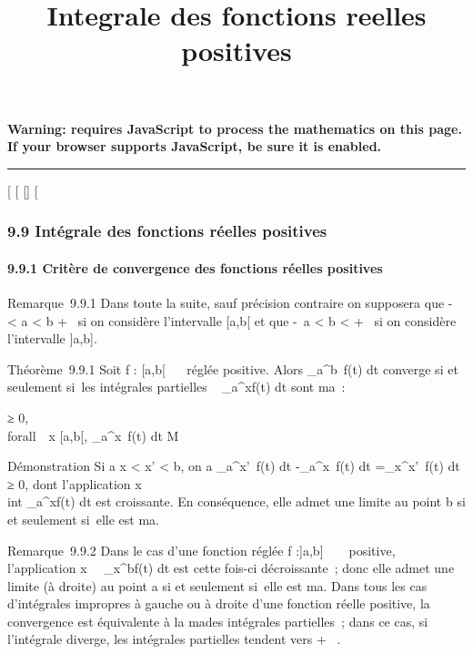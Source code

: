 \documentclass[]{article}
\title{Integrale des fonctions reelles positives}
\author{}
\date{}
\begin{document}
\maketitle

\textbf{Warning: 
requires JavaScript to process the mathematics on this page.\\ If your
browser supports JavaScript, be sure it is enabled.}

\begin{center}\rule{3in}{0.4pt}\end{center}

{[}
{[}
{[}{]}
{[}

\subsubsection{9.9 Intégrale des fonctions réelles positives}

\paragraph{9.9.1 Critère de convergence des fonctions réelles positives}

Remarque~9.9.1 Dans toute la suite, sauf précision contraire on
supposera que -\infty~ \textless{} a \textless{} b \leq +\infty~ si on considère
l'intervalle {[}a,b{[} et que -\infty~\leq a \textless{} b \textless{} +\infty~ si on
considère l'intervalle {]}a,b{]}.

Théorème~9.9.1 Soit f : {[}a,b{[}\rightarrow~ ~ réglée positive. Alors
\int  \_a^b~f(t) dt converge si et
seulement si~les intégrales partielles \int ~
\_a^xf(t) dt sont ma~:

\existsM ≥ 0, \\forall~~x \in
{[}a,b{[}, \int  \_a^x~f(t) dt \leq M

Démonstration Si a \leq x \textless{} x' \textless{} b, on a
\int  \_a^x'~f(t) dt
-\int  \_a^x~f(t) dt
=\int  \_x^x'~f(t) dt ≥ 0, dont
l'application x\mapsto~\\int
 \_a^xf(t) dt est croissante. En conséquence, elle admet
une limite au point b si et seulement si~elle est ma.

Remarque~9.9.2 Dans le cas d'une fonction réglée f :{]}a,b{]} \rightarrow~ ~
positive, l'application
x\mapsto~\int ~
\_x^bf(t) dt est cette fois-ci décroissante~; donc elle
admet une limite (à droite) au point a si et seulement si~elle est
ma. Dans tous les cas d'intégrales impropres à gauche ou à droite
d'une fonction réelle positive, la convergence est équivalente à la
ma\jmathoration des intégrales partielles~; dans ce cas, si l'intégrale
diverge, les intégrales partielles tendent vers + \infty~.
\end{document}
